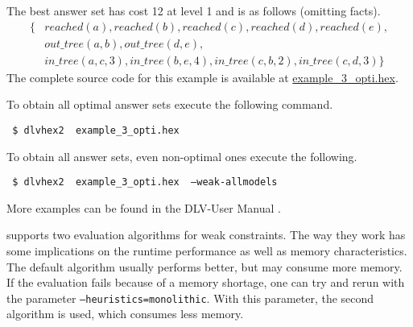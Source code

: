 \documentclass[a4paper, titlepage]{article}
\newcommand{\mi}[1]{\mathit{#1}}
\newcommand{\examplelink}[1]{\url{https://github.com/hexhex/manual/tree/master/#1}}
\newcommand{\exampledownloadlink}[2]{\href{https://github.com/hexhex/manual/raw/master/#1}{#2}}
\newcommand\leftaligned[1]{\par \smallskip \noindent \qquad #1 \smallskip \par}
\begin{document}
\begin{exmp}
The best answer set has cost 12 at level 1 and is as follows
(omitting facts).
\begin{align*}
\{ & \mi{reached(a), reached(b), reached(c), reached(d), reached(e)}, \\
   & \mi{out\_tree(a,b), out\_tree(d,e)}, \\
   & \mi{in\_tree(a,c,3), in\_tree(b,e,4), in\_tree(c,b,2), in\_tree(c,d,3)}\} 
\end{align*}
The complete source code for this example is available at
\exampledownloadlink{example_3_opti/example_3_opti.hex}{example\_3\_opti.hex}.

To obtain all optimal answer sets execute the following command.
\leftaligned{\texttt{ \$ dlvhex2 \ example\_3\_opti.hex}}

To obtain all answer sets, even non-optimal ones execute the following.
%
\leftaligned{\texttt{ \$ dlvhex2 \ example\_3\_opti.hex \ --weak-allmodels}}
\end{exmp}

More examples can be found in the DLV-User Manual \cite{brfwilvpg2009}.

\dlvhex{} supports two evaluation algorithms for weak constraints. The way they work has some implications on the runtime performance as well as memory characteristics. The default algorithm usually performs better, but may consume more memory. If the evaluation fails because of a memory shortage, one can try and rerun \dlvhex{} with the parameter \texttt{--heuristics=monolithic}. With this parameter, the second algorithm is used, which consumes less memory.
\end{document}
